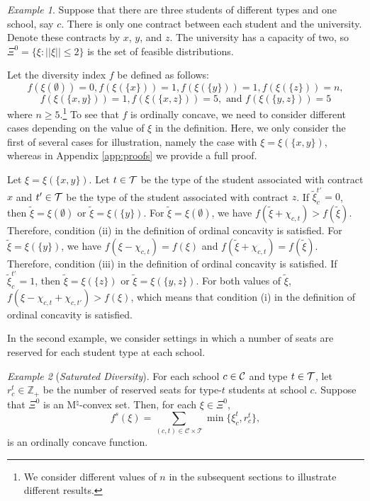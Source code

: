 \documentclass[12pt]{amsart}
\theoremstyle{remark}
\newtheorem{example}{Example}
\newcommand{\norm}[1]{|| #1 ||}
\begin{document}
\begin{example}\label{ex:ladfail}
Suppose that there are three students of different types and one school, say $c$.
There is only one contract between each student and the university.
Denote these contracts by $x$, $y$, and $z$. %
The university has a capacity of two, so $\Xi^0=\{\xi:\norm{\xi} \leq 2\}$
is the set of feasible distributions.

Let the diversity index $f$ be defined as follows:
\[f(\xi(\emptyset))=0, f(\xi(\{x\}))=1, f(\xi(\{y\}))=1, f(\xi(\{z\}))=n,\]
\[f(\xi(\{x,y\}))=1, f(\xi(\{x,z\}))=5, \text{ and } f(\xi(\{y,z\}))=5\]
where $n \geq 5$.\footnote{We consider different values of $n$
in the subsequent sections to illustrate different results.}
To see that $f$ is ordinally concave, we need to consider different cases
depending on the value of $\xi$ in the definition.
Here, we  only consider the first of several cases for illustration,
namely the case with $\xi=\xi(\{x,y\})$, whereas
in Appendix \ref{app:proofs} we provide a full proof.

Let $\xi=\xi(\{x,y\})$. Let $t\in \mathcal{T}$ be the type of the
student associated with contract $x$ and $t'\in \mathcal{T}$ be the type of the student
associated with contract $z$.
If $\tilde{\xi}_{c}^{t'}=0$, then $\tilde{\xi}=\xi(\emptyset)$
or $\tilde{\xi}=\xi(\{y\})$. For $\tilde \xi=\xi(\emptyset)$, we have
$f(\tilde \xi + \chi_{c,t})>f(\tilde \xi)$. Therefore, condition (ii) in the definition of ordinal concavity is satisfied. For $\tilde \xi=\xi(\{y\})$, we have $f(\xi-\chi_{c,t})=f(\xi)$ and $f(\tilde \xi+\chi_{c,t})=f(\tilde \xi)$. Therefore, condition (iii) in the definition of ordinal concavity is satisfied.
If $\tilde{\xi}_{c}^{t'}=1$, then $\tilde{\xi}=\xi(\{z\})$ or $\tilde{\xi}=\xi(\{y,z\})$. For both values of $\tilde \xi$,
$f(\xi-\chi_{c,t}+\chi_{c,t'})>f(\xi)$, which means that
condition (i) in the definition of ordinal concavity is satisfied.
\end{example}


In the second example, we consider settings in which a number of seats
are reserved for each student type at each school.

\begin{example}[\emph{Saturated Diversity}]\label{ex:saturated}
For each school $c\in \mathcal{C}$ and type $t\in \mathcal{T}$, let $r^t_c\in \mathbb Z_+$ be
the number of reserved seats for type-$t$ students at school $c$. Suppose that
$\Xi^0$ is an M$^{\natural}$-convex set. Then, for
each $\xi\in \Xi^0$,
\[f^s(\xi)=\sum_{(c,t) \in \mathcal{C} \times \mathcal{T}} \min\{ \xi^t_c, r^t_c\},
\]
is an ordinally concave function.
\end{example}
\end{document}
